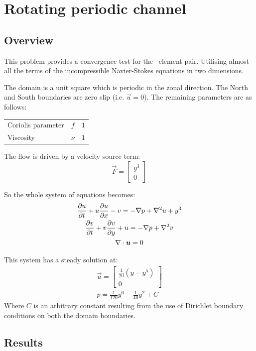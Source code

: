 \section{Rotating periodic channel}
\label{sect:periodic_channel}

\subsection{Overview}

This problem provides a convergence test for the \PoDGPt\ element pair.
Utilising almost all the terms of the incompressible Navier-Stokes equations
in two dimensions.

The domain is a unit square which is periodic in the zonal direction. The
North and South boundaries are zero slip (i.e. $\vec{u}=0$). The remaining
parameters are as follows:

\begin{tabular}{lll}
  Coriolis parameter & $f$ & $1$ \\
  Viscosity & $\nu$ & $1$ 
\end{tabular}

The flow is driven by a velocity source term:
\begin{equation}
  \vec{F}=
  \begin{bmatrix}
    y^3 \\
    0
  \end{bmatrix}
\end{equation}

So the whole system of equations becomes:
\begin{gather}
  \ppt{u}+u\ppt[x]{u}-v=-\grad p + \grad^2 u +y^3\\
  \ppt{v}+v\ppt[y]{v}+u=-\grad p + \grad^2 v\\
  \div\vec{u}=0
\end{gather}

This system has a steady solution at:
\begin{gather}
  \vec{u}=
  \begin{bmatrix}
    \frac{1}{20}(y-y^5)\\
    0
  \end{bmatrix}\\
  p=\frac{1}{120}y^6-\frac{1}{40}y^2+C
\end{gather}
Where $C$ is an arbitrary constant resulting from the use of Dirichlet
boundary conditions on both the domain boundaries.

\subsection{Results}

